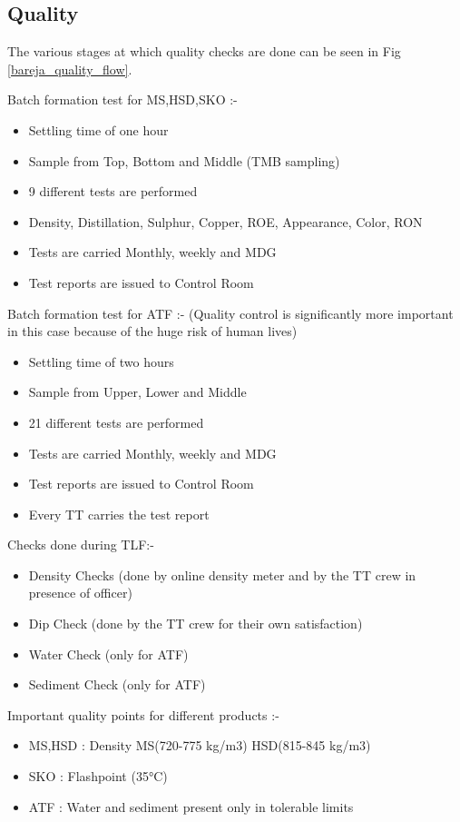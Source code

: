 \documentclass{report}
\begin{document}
	\subsection{Quality}
	The various stages at which quality checks are done can be seen in Fig \ref{bareja_quality_flow}.\par
	Batch formation test for MS,HSD,SKO :-
	\begin{itemize}
		\item Settling time of one hour
		\item Sample from Top, Bottom and Middle (TMB sampling)
		\item 9 different tests are performed
		\item Density, Distillation, Sulphur, Copper, ROE, Appearance, Color, RON
		\item Tests are carried Monthly, weekly and MDG
		\item Test reports are issued to Control Room
	\end{itemize}
	Batch formation test for ATF :- (Quality control is significantly more important in this case because of the huge risk of human lives)
	\begin{itemize}
		\item Settling time of two hours
		\item Sample from Upper, Lower and Middle
		\item 21 different tests are performed
		\item Tests are carried Monthly, weekly and MDG
		\item Test reports are issued to Control Room
		\item Every TT carries the test report
	\end{itemize}
	Checks done during TLF:-
	\begin{itemize}
		\item Density Checks (done by online density meter and by the TT crew in presence of officer)
		\item Dip Check (done by the TT crew for their own satisfaction)
		\item Water Check (only for ATF)
		\item Sediment Check (only for ATF)
	\end{itemize}
	Important quality points for different products :-
	\begin{itemize}
		\item MS,HSD : Density MS(720-775 kg/m3) HSD(815-845 kg/m3)
		\item SKO : Flashpoint (\ang{35}C)
		\item ATF : Water and sediment present only in tolerable limits
	\end{itemize}
\end{document}
